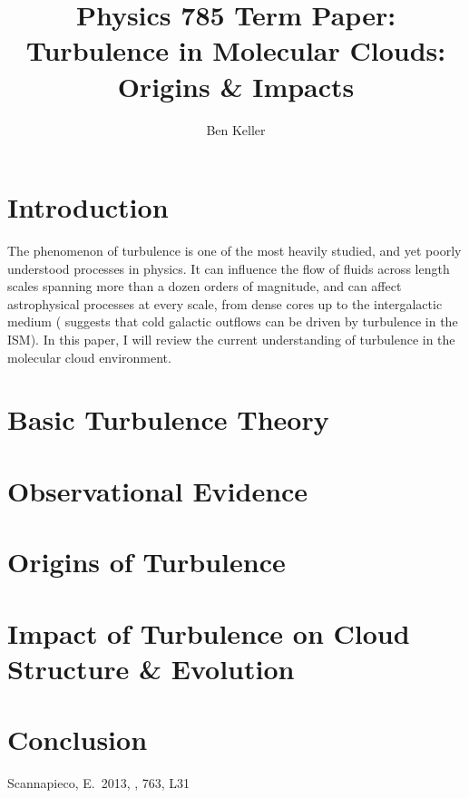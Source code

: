 \documentclass[12pt, preprint]{aastex}
\begin{document}
\title{Physics 785 Term Paper: Turbulence in Molecular Clouds: Origins \&
Impacts}
\author{Ben Keller}
\maketitle
\newpage
\section{Introduction}
The phenomenon of turbulence is one of the most heavily studied, and yet poorly
understood processes in physics.  It can influence the flow of fluids across
length scales spanning more than a dozen orders of magnitude, and can affect
astrophysical processes at every scale, from dense cores up to the intergalactic
medium (\citet{scan2013} suggests that cold galactic outflows can be
driven by turbulence in the ISM).  In this paper, I will review the current understanding of turbulence in
the molecular cloud environment.
\section{Basic Turbulence Theory}
\section{Observational Evidence}
\section{Origins of Turbulence}
\section{Impact of Turbulence on Cloud Structure \& Evolution}
\section{Conclusion}
\begin{thebibliography}{}
	 Scannapieco, E.\ 2013, \apjl, 763, L31 
\end{thebibliography}
\end{document}
